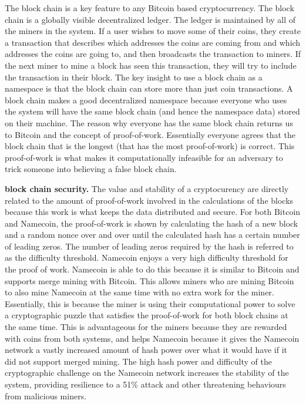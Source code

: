 The block chain is a key feature to any Bitcoin based cryptocurrency. The block chain is a globally visible decentralized ledger. The ledger is maintained by all of the miners in the system. If a user wishes to move some of their coins, they create a transaction that describes which addresses the coins are coming from and which addresses the coins are going to, and then broadcasts the transaction to miners. If the next miner to mine a block has seen this transaction, they will try to include the transaction in their block.
    The key insight to use a block chain as a namespace is that the block chain can store more than just coin transactions. A block chain makes a good decentralized namespace because everyone who uses the system will have the same block chain (and hence the namespace data) stored on their machine. The reason why everyone has the same block chain returns us to Bitcoin and the concept of proof-of-work. Essentially everyone agrees that the block chain that is the longest (that has the most proof-of-work) is correct. This proof-of-work is what makes it computationally infeasible for an adversary to trick someone into believing a false block chain. 

{\bf block chain security.}
The value and stability of a cryptocurency are directly related to the amount of proof-of-work involved in the calculations of the blocks because this work is what keeps the data distributed and secure. For both Bitcoin and Namecoin, the proof-of-work is shown by calculating the hash of a new block and a random nonce over and over until the calculated hash has a certain number of leading zeros. The number of leading zeros required by the hash is referred to as the difficulty threshold. Namecoin enjoys a very high difficulty threshold for the proof of work. Namecoin is able to do this because it is similar to Bitcoin and supports merge mining with Bitcoin. This allows miners who are mining Bitcoin to also mine Namecoin at the same time with no extra work for the miner. Essentially, this is because the miner is using their computational power to solve a cryptographic puzzle that satisfies the proof-of-work for both block chains at the same time. This is advantageous for the miners because they are rewarded with coins from both systems, and helps Namecoin because it gives the Namecoin network a vastly increased amount of hash power over what it would have if it did not support merged mining. The high hash power and difficulty of the cryptographic challenge on the Namecoin network increases the stability of the system, providing resilience to a 51\% attack and other threatening behaviours from malicious miners.

